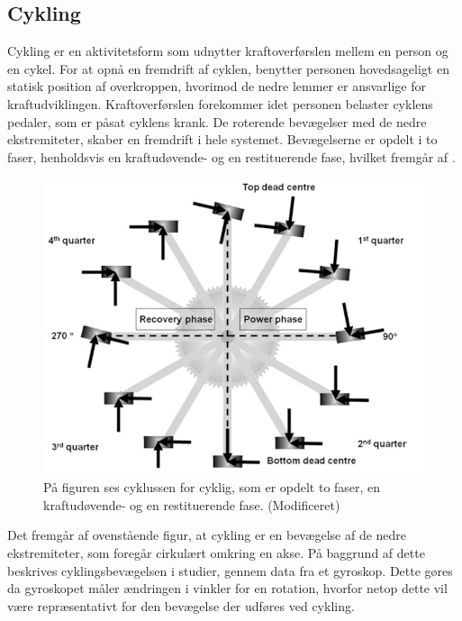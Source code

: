 \subsection{Cykling}
Cykling er en aktivitetsform som udnytter kraftoverførslen mellem en person og en cykel. For at opnå en fremdrift af cyklen, benytter personen hovedsageligt en statisk position af overkroppen, hvorimod de nedre lemmer er ansvarlige for kraftudviklingen. \citep{Springer2014} \newline 
Kraftoverførslen forekommer idet personen belaster cyklens pedaler, som er påsat cyklens krank. De roterende bevægelser med de nedre ekstremiteter, skaber en fremdrift i hele systemet. Bevægelserne er opdelt i to faser, henholdsvis en kraftudøvende- og en restituerende fase, hvilket fremgår af .

\begin{figure}[H]
	\centering
	\includegraphics[scale=0.5]{figures/bProblemloesning/cykel_cyklus.png}
	\caption{På figuren ses cyklussen for cyklig, som er opdelt to faser, en kraftudøvende- og en restituerende fase. \citep{Springer2014} (Modificeret)}
	\label{fig:cykel_cyklus}
\end{figure}

Det fremgår af ovenstående figur, at cykling er en bevægelse af de nedre ekstremiteter, som foregår cirkulært omkring en akse. På baggrund af dette beskrives cyklingsbevægelsen i studier, gennem data fra et gyroskop. Dette gøres da gyroskopet måler ændringen i vinkler for en rotation, hvorfor netop dette vil være repræsentativt for den bevægelse der udføres ved cykling. \citep{Cockcroft2011,Marin-PerianuMarin-Perianu2013}

